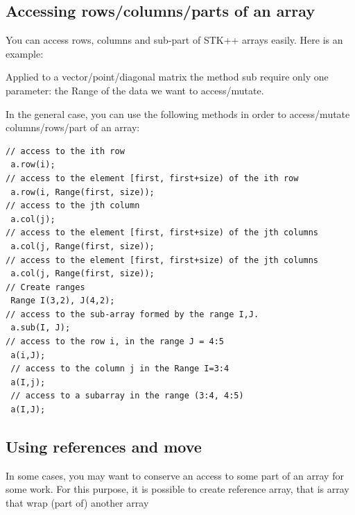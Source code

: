 \documentclass[a4paper,10pt]{article}
\begin{document}
\subsection{Accessing rows/columns/parts of an array}

You can access rows, columns and sub-part of STK++ arrays easily. Here is an example:

\begin{minipage}[t]{0.66\textwidth}

\end{minipage}
\hspace{0.2cm}
\begin{minipage}[t]{0.33\textwidth}
\addtocounter{lstlisting}{-1}

\end{minipage}

Applied to a vector/point/diagonal matrix the method sub require only
one parameter: the Range of the data we want to access/mutate.

In the general case, you can use the following methods in order to access/mutate
columns/rows/part of an array:
\begin{lstlisting}[style=customcpp,caption=Review of the main accessors]
// access to the ith row
 a.row(i);
// access to the element [first, first+size) of the ith row
 a.row(i, Range(first, size));
// access to the jth column
 a.col(j);
// access to the element [first, first+size) of the jth columns
 a.col(j, Range(first, size));
// access to the element [first, first+size) of the jth columns
 a.col(j, Range(first, size));
// Create ranges
 Range I(3,2), J(4,2);
// access to the sub-array formed by the range I,J.
 a.sub(I, J);
// access to the row i, in the range J = 4:5
 a(i,J);
 // access to the column j in the Range I=3:4
 a(I,j);
 // access to a subarray in the range (3:4, 4:5)
 a(I,J);
\end{lstlisting}


\subsection{Using references and move}

In some cases, you may want to conserve an access to some part of an array
for some work. For this purpose, it is possible to create reference
array, that is array that wrap (part of) another array

\begin{minipage}[t]{0.66\textwidth}

\end{minipage}
\hspace{0.2cm}
\begin{minipage}[t]{0.33\textwidth}
\addtocounter{lstlisting}{-1}

\end{minipage}
\end{document}
